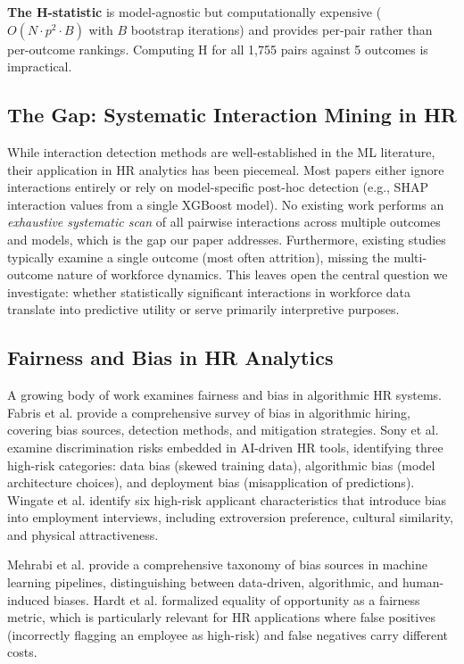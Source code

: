 \documentclass[conference]{IEEEtran}
\newcounter{algorithm}
\begin{document}
\textbf{The H-statistic} is model-agnostic but computationally expensive ($O(N\cdot p^2\cdot B)$ with $B$ bootstrap iterations) and provides per-pair rather than per-outcome rankings. Computing H for all 1,755 pairs against 5 outcomes is impractical.

\subsection{The Gap: Systematic Interaction Mining in HR}

While interaction detection methods are well-established in the ML literature, their application in HR analytics has been piecemeal. Most papers either ignore interactions entirely or rely on model-specific post-hoc detection (e.g., SHAP interaction values from a single XGBoost model). No existing work performs an \textit{exhaustive systematic scan} of all pairwise interactions across multiple outcomes and models, which is the gap our paper addresses. Furthermore, existing studies typically examine a single outcome (most often attrition), missing the multi-outcome nature of workforce dynamics. This leaves open the central question we investigate: whether statistically significant interactions in workforce data translate into predictive utility or serve primarily interpretive purposes.

\subsection{Fairness and Bias in HR Analytics}

A growing body of work examines fairness and bias in algorithmic HR systems. Fabris et al. \cite{fabris2025fairness} provide a comprehensive survey of bias in algorithmic hiring, covering bias sources, detection methods, and mitigation strategies. Sony et al. \cite{sony2025bias} examine discrimination risks embedded in AI-driven HR tools, identifying three high-risk categories: data bias (skewed training data), algorithmic bias (model architecture choices), and deployment bias (misapplication of predictions). Wingate et al. \cite{wingate2024bias} identify six high-risk applicant characteristics that introduce bias into employment interviews, including extroversion preference, cultural similarity, and physical attractiveness.

Mehrabi et al. \cite{mehrabi2021survey} provide a comprehensive taxonomy of bias sources in machine learning pipelines, distinguishing between data-driven, algorithmic, and human-induced biases. Hardt et al. \cite{hardt2016equality} formalized equality of opportunity as a fairness metric, which is particularly relevant for HR applications where false positives (incorrectly flagging an employee as high-risk) and false negatives carry different costs.
\end{document}
